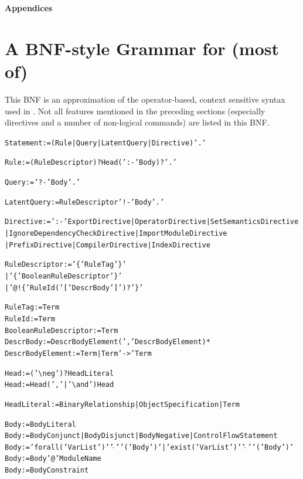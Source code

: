 \documentclass[11pt]{article}
\newcommand{\ERGO}{\mbox{\smaller{\ensuremath{\cal{E}}\smaller{{\sc{RGO}}}}}\xspace}
\newcommand{\FLSYSTEM}{\ERGO}
\newcommand{\bs}{\textbackslash}
\newcommand{\RULELOGNEG}{{\texttt{{\bs}neg}}\xspace}
\begin{document}
\appendix

\newpage

\noindent
{\LARGE\bf Appendices}

\section{A BNF-style Grammar for (most of) \FLSYSTEM}\label{app-bnf}

This BNF is an approximation of the operator-based,
context sensitive syntax used in \FLSYSTEM. Not all features mentioned in
the preceding sections (especially directives and a number of
non-logical commands) are listed in this BNF.

{\small
\begin{alltt}

Statement := (Rule | Query | LatentQuery | Directive) '.'

Rule := (RuleDescriptor)? Head (':-' Body)? '.'

Query := '?-' Body '.'

LatentQuery := RuleDescriptor '!-' Body '.'

Directive := ':-' ExportDirective | OperatorDirective | SetSemanticsDirective
	             | IgnoreDependencyCheckDirective | ImportModuleDirective
                     | PrefixDirective | CompilerDirective | IndexDirective

RuleDescriptor := '\@\{' RuleTag '\}'
                  | '\@\@\{' BooleanRuleDescriptor '\}'
                  | '@!\{' RuleId ( '[' DescrBody ']' )? '\}'

RuleTag := Term
RuleId := Term
BooleanRuleDescriptor := Term
DescrBody := DescrBodyElement (',' DescrBodyElement)*
DescrBodyElement := Term | Term '->' Term

Head := ('\RULELOGNEG')? HeadLiteral
Head := Head (',' | '\bs{}and') Head

HeadLiteral := BinaryRelationship | ObjectSpecification | Term

Body := BodyLiteral
Body := BodyConjunct | BodyDisjunct | BodyNegative | ControlFlowStatement
Body := 'forall(' VarList ')' '\ensuremath{\widehat{\ }}' '(' Body ')' | 'exist(' VarList ')' '\ensuremath{\widehat{\ }}' '(' Body ')'
Body := Body '@' ModuleName
Body := BodyConstraint


\end{alltt}}
\end{document}
